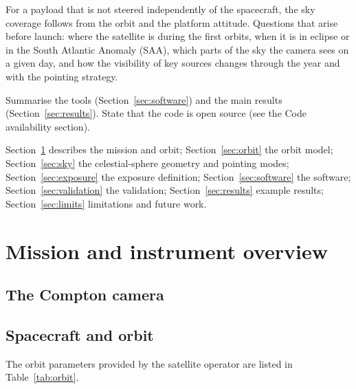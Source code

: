 \documentclass[a4paper,fleqn]{cas-sc}
\newif\ifshowtodos
\newcommand{\todo}[1]{\ifshowtodos{\color{red!70!black}\textbf{[TODO:} #1\textbf{]}}\fi}
\begin{document}
\todo{The planning problem.} For a payload that is not steered independently
of the spacecraft, the sky coverage follows from the orbit and the platform
attitude. Questions that arise before launch: where the satellite is during
the first orbits, when it is in eclipse or in the South Atlantic Anomaly (SAA),
which parts of the sky the camera sees on a given day, and how the visibility
of key sources changes through the year and with the pointing strategy.

\todo{Contribution.} Summarise the tools (Section~\ref{sec:software}) and the
main results (Section~\ref{sec:results}). State that the code is open source
(see the Code availability section).

\todo{Paper outline.} Section~\ref{sec:mission} describes the mission and
orbit; Section~\ref{sec:orbit} the orbit model; Section~\ref{sec:sky} the
celestial-sphere geometry and pointing modes; Section~\ref{sec:exposure} the
exposure definition; Section~\ref{sec:software} the software;
Section~\ref{sec:validation} the validation; Section~\ref{sec:results} example
results; Section~\ref{sec:limits} limitations and future work.

\section{Mission and instrument overview}
\label{sec:mission}

\subsection{The Compton camera}
\label{sec:camera}
\todo{Detector layers, materials, read-out, energy range, angular resolution,
field of view, expected effective area. Cite the instrument paper.}

\subsection{Spacecraft and orbit}
\label{sec:orbitparams}
The orbit parameters provided by the satellite operator are listed in
Table~\ref{tab:orbit}. \todo{Host platform, attitude-control capability,
mounting of the camera, expected launch vehicle and date.}
\end{document}
